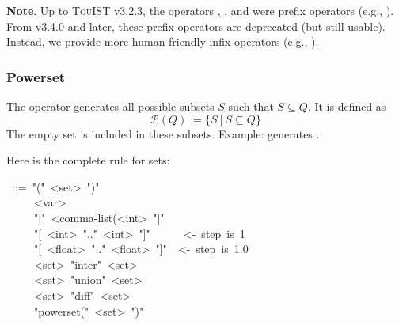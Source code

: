 {\noindent\textbf{Note}.
Up to {\scshape TouIST} v3.2.3, the operators , ,  and
 were prefix operators (e.g., ). From v3.4.0
and later, these prefix operators are deprecated (but still usable).
Instead, we provide more human-friendly infix operators (e.g.,
).%

\subsubsection{Powerset}\label{powerset}%

\noindent The  operator generates all possible subsets $S$ such
that $S \subseteq Q$. It is defined as%
\noindent\noindent\[\mathcal{P}(Q) := \{S~|~S\subseteq Q\}
\]%
\noindent The empty set is included in these subsets. Example:
 generates .

Here is the complete rule for sets:%
\begin{mdpre}%
~::=~"("~{\textless{}set\textgreater{}}~")"\\
~~~~\textbar{}~{\textless{}var\textgreater{}}\\
~~~~\textbar{}~"{}["~{\textless{}comma-list(\textless{}int\textgreater{}}~"]"\\
~~~~\textbar{}~"{}[~{\textless{}int\textgreater{}}~".."~{\textless{}int\textgreater{}}~"]"~~~~~~{\textless{}-~step~is~1}\\
~~~~\textbar{}~"{}[~{\textless{}float\textgreater{}}~".."~{\textless{}float\textgreater{}}~"]"~~{\textless{}-~step~is~1.0}\\
~~~~\textbar{}~{\textless{}set\textgreater{}}~"inter"~{\textless{}set\textgreater{}}\\
~~~~\textbar{}~{\textless{}set\textgreater{}}~"union"~{\textless{}set\textgreater{}}\\
~~~~\textbar{}~{\textless{}set\textgreater{}}~"diff"~{\textless{}set\textgreater{}}\\
~~~~\textbar{}~"powerset("~{\textless{}set\textgreater{}}~")"%
\end{mdpre}
}
